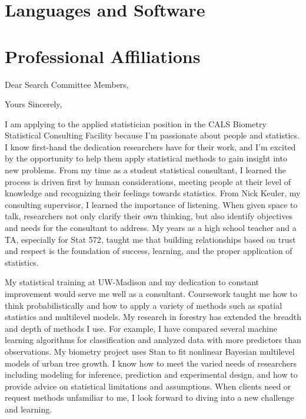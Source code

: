 \documentclass[11pt, sans]{moderncv}
\begin{document}

\section*{Languages and Software}
\label{sec:org22bed7f}

\section*{Professional Affiliations}
\label{sec:org7c26b84}


\clearpage
{}
\date{\today}
\opening{Dear Search Committee Members, }
\closing{Yours Sincerely,}
\makelettertitle

I am applying to the applied statistician position in the CALS
Biometry Statistical Consulting Facility because I'm passionate about
people and statistics.  I know first-hand the dedication researchers
have for their work, and I'm excited by the opportunity to help them
apply statistical methods to gain insight into new problems.  From my
time as a student statistical consultant, I learned the process is
driven first by human considerations, meeting people at their level of
knowledge and recognizing their feelings towards statistics.  From
Nick Keuler, my consulting supervisor, I learned the importance
of listening. When given space to talk, researchers not only clarify
their own thinking, but also identify objectives and needs for the
consultant to address.  My years as a high school teacher and a TA,
especially for Stat 572, taught me that building relationships based
on trust and respect is the foundation of success, learning, and the
proper application of statistics.

My statistical training at UW-Madison and my dedication to constant
improvement would serve me well as a consultant.  Coursework taught me
how to think probabilistically and how to apply a variety of methods
such as spatial statistics and multilevel models.  My research in
forestry has extended the breadth and depth of methods I use.  For
example, I have compared several machine learning algorithms for
classification and analyzed data with more predictors than
observations.  My biometry project uses Stan to fit nonlinear Bayesian
multilevel models of urban tree growth.  I know how to meet the varied
needs of researchers including modeling for inference, prediction and
experimental design, and how to provide advice on statistical
limitations and assumptions.  When clients need or request methods
unfamiliar to me, I look forward to diving into a new challenge and
learning.
\end{document}
